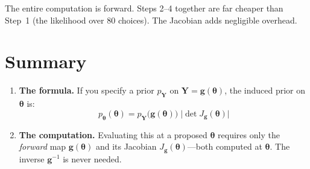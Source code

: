 \documentclass[11pt,a4paper]{article}
\theoremstyle{definition}
\newcommand{\btheta}{\boldsymbol{\theta}}
\begin{document}
The entire computation is forward. Steps 2--4 together are far cheaper than
Step~1 (the likelihood over 80 choices). The Jacobian adds negligible overhead.


\section{Summary}
\label{sec:summary}

\begin{keyresult}
\begin{enumerate}
    \item \textbf{The formula.} If you specify a prior $p_{\mathbf{Y}}$ on
    $\mathbf{Y} = \mathbf{g}(\btheta)$, the induced prior on $\btheta$ is:
    \begin{equation*}
        p_{\btheta}(\btheta) = p_{\mathbf{Y}}\!\big(\mathbf{g}(\btheta)\big)
        \;\big|\!\det J_{\mathbf{g}}(\btheta)\big|
    \end{equation*}

    \item \textbf{The computation.} Evaluating this at a proposed $\btheta$
    requires only the \emph{forward} map $\mathbf{g}(\btheta)$ and its
    Jacobian $J_{\mathbf{g}}(\btheta)$---both computed at $\btheta$.
    The inverse $\mathbf{g}^{-1}$ is never needed.
\end{enumerate}
\end{keyresult}
\end{document}
